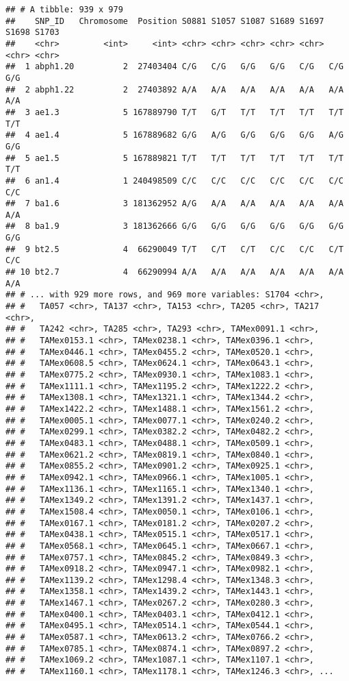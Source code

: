 \documentclass[]{article}
\begin{document}
\begin{verbatim}
## # A tibble: 939 x 979
##    SNP_ID   Chromosome  Position S0881 S1057 S1087 S1689 S1697 S1698 S1703
##    <chr>         <int>     <int> <chr> <chr> <chr> <chr> <chr> <chr> <chr>
##  1 abph1.20          2  27403404 C/G   C/G   G/G   G/G   C/G   C/G   G/G  
##  2 abph1.22          2  27403892 A/A   A/A   A/A   A/A   A/A   A/A   A/A  
##  3 ae1.3             5 167889790 T/T   G/T   T/T   T/T   T/T   T/T   T/T  
##  4 ae1.4             5 167889682 G/G   A/G   G/G   G/G   G/G   A/G   G/G  
##  5 ae1.5             5 167889821 T/T   T/T   T/T   T/T   T/T   T/T   T/T  
##  6 an1.4             1 240498509 C/C   C/C   C/C   C/C   C/C   C/C   C/C  
##  7 ba1.6             3 181362952 A/G   A/A   A/A   A/A   A/A   A/A   A/A  
##  8 ba1.9             3 181362666 G/G   G/G   G/G   G/G   G/G   G/G   G/G  
##  9 bt2.5             4  66290049 T/T   C/T   C/T   C/C   C/C   C/T   C/C  
## 10 bt2.7             4  66290994 A/A   A/A   A/A   A/A   A/A   A/A   A/A  
## # ... with 929 more rows, and 969 more variables: S1704 <chr>,
## #   TA057 <chr>, TA137 <chr>, TA153 <chr>, TA205 <chr>, TA217 <chr>,
## #   TA242 <chr>, TA285 <chr>, TA293 <chr>, TAMex0091.1 <chr>,
## #   TAMex0153.1 <chr>, TAMex0238.1 <chr>, TAMex0396.1 <chr>,
## #   TAMex0446.1 <chr>, TAMex0455.2 <chr>, TAMex0520.1 <chr>,
## #   TAMex0608.5 <chr>, TAMex0624.1 <chr>, TAMex0643.1 <chr>,
## #   TAMex0775.2 <chr>, TAMex0930.1 <chr>, TAMex1083.1 <chr>,
## #   TAMex1111.1 <chr>, TAMex1195.2 <chr>, TAMex1222.2 <chr>,
## #   TAMex1308.1 <chr>, TAMex1321.1 <chr>, TAMex1344.2 <chr>,
## #   TAMex1422.2 <chr>, TAMex1488.1 <chr>, TAMex1561.2 <chr>,
## #   TAMex0005.1 <chr>, TAMex0077.1 <chr>, TAMex0240.2 <chr>,
## #   TAMex0299.1 <chr>, TAMex0382.2 <chr>, TAMex0482.2 <chr>,
## #   TAMex0483.1 <chr>, TAMex0488.1 <chr>, TAMex0509.1 <chr>,
## #   TAMex0621.2 <chr>, TAMex0819.1 <chr>, TAMex0840.1 <chr>,
## #   TAMex0855.2 <chr>, TAMex0901.2 <chr>, TAMex0925.1 <chr>,
## #   TAMex0942.1 <chr>, TAMex0966.1 <chr>, TAMex1005.1 <chr>,
## #   TAMex1136.1 <chr>, TAMex1165.1 <chr>, TAMex1340.1 <chr>,
## #   TAMex1349.2 <chr>, TAMex1391.2 <chr>, TAMex1437.1 <chr>,
## #   TAMex1508.4 <chr>, TAMex0050.1 <chr>, TAMex0106.1 <chr>,
## #   TAMex0167.1 <chr>, TAMex0181.2 <chr>, TAMex0207.2 <chr>,
## #   TAMex0438.1 <chr>, TAMex0515.1 <chr>, TAMex0517.1 <chr>,
## #   TAMex0568.1 <chr>, TAMex0645.1 <chr>, TAMex0667.1 <chr>,
## #   TAMex0757.1 <chr>, TAMex0845.2 <chr>, TAMex0849.3 <chr>,
## #   TAMex0918.2 <chr>, TAMex0947.1 <chr>, TAMex0982.1 <chr>,
## #   TAMex1139.2 <chr>, TAMex1298.4 <chr>, TAMex1348.3 <chr>,
## #   TAMex1358.1 <chr>, TAMex1439.2 <chr>, TAMex1443.1 <chr>,
## #   TAMex1467.1 <chr>, TAMex0267.2 <chr>, TAMex0280.3 <chr>,
## #   TAMex0400.1 <chr>, TAMex0403.1 <chr>, TAMex0412.1 <chr>,
## #   TAMex0495.1 <chr>, TAMex0514.1 <chr>, TAMex0544.1 <chr>,
## #   TAMex0587.1 <chr>, TAMex0613.2 <chr>, TAMex0766.2 <chr>,
## #   TAMex0785.1 <chr>, TAMex0874.1 <chr>, TAMex0897.2 <chr>,
## #   TAMex1069.2 <chr>, TAMex1087.1 <chr>, TAMex1107.1 <chr>,
## #   TAMex1160.1 <chr>, TAMex1178.1 <chr>, TAMex1246.3 <chr>, ...
\end{verbatim}
\end{document}
